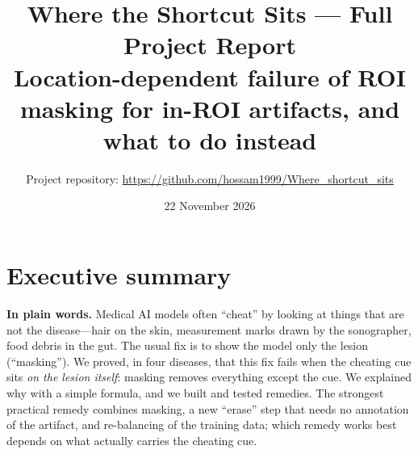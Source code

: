 \documentclass[11pt,a4paper]{article}
\title{Where the Shortcut Sits --- Full Project Report\\\large Location-dependent failure of ROI masking for in-ROI artifacts, and what to do instead}
\author{Project repository: \url{https://github.com/hossam1999/Where_shortcut_sits}}
\date{22 November 2026}
\newcommand{\plain}[1]{\par\noindent\colorbox{blue!6}{\parbox{\dimexpr\linewidth-2\fboxsep}{\textbf{In plain words.} #1}}\par\medskip}
\begin{document}
\sloppy
\maketitle
\tableofcontents
\newpage

\section{Executive summary}
\plain{Medical AI models often ``cheat'' by looking at things that are not the disease---hair on the skin, measurement
marks drawn by the sonographer, food debris in the gut. The usual fix is to show the model only the lesion (``masking'').
We proved, in four diseases, that this fix fails when the cheating cue sits \emph{on the lesion itself}: masking removes
everything except the cue. We explained why with a simple formula, and we built and tested remedies. The strongest
practical remedy combines masking, a new ``erase'' step that needs no annotation of the artifact, and re-balancing of the
training data; which remedy works best depends on what actually carries the cheating cue.}
\end{document}

